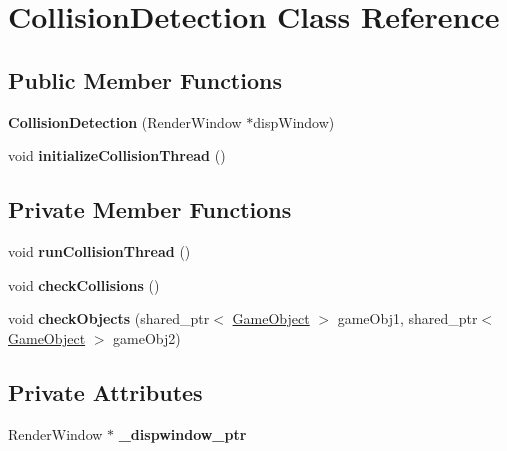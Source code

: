 \hypertarget{class_collision_detection}{}\section{Collision\+Detection Class Reference}
\label{class_collision_detection}
\subsection*{Public Member Functions}
\begin{DoxyCompactItemize}
\item 
\mbox{\label{class_collision_detection_a3f9bc79550f37b2c929dfef9ea1a82e3}} 
{\bfseries Collision\+Detection} (Render\+Window $\ast$disp\+Window)
\item 
\mbox{\label{class_collision_detection_ad100d45a6884ee0b9e714833af04553c}} 
void {\bfseries initialize\+Collision\+Thread} ()
\end{DoxyCompactItemize}
\subsection*{Private Member Functions}
\begin{DoxyCompactItemize}
\item 
\mbox{\label{class_collision_detection_a1eda3727a959c4aa24fad3ef46a7b530}} 
void {\bfseries run\+Collision\+Thread} ()
\item 
\mbox{\label{class_collision_detection_a9b39c9264288db71452ce2f66a79c4f1}} 
void {\bfseries check\+Collisions} ()
\item 
\mbox{\label{class_collision_detection_af3a234d784ff1995558364dbcd0936ab}} 
void {\bfseries check\+Objects} (shared\+\_\+ptr$<$ \hyperlink{class_game_object}{Game\+Object} $>$ game\+Obj1, shared\+\_\+ptr$<$ \hyperlink{class_game_object}{Game\+Object} $>$ game\+Obj2)
\end{DoxyCompactItemize}
\subsection*{Private Attributes}
\begin{DoxyCompactItemize}
\item 
\mbox{\label{class_collision_detection_a6ff887986bbe096d995d535748c94d56}} 
Render\+Window $\ast$ {\bfseries \+\_\+dispwindow\+\_\+ptr}
\end{DoxyCompactItemize}


